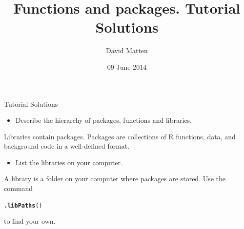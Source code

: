 \documentclass{beamer}\usepackage[]{graphicx}\usepackage[]{color}
\makeatletter
\newcommand{\hlstd}[1]{\textcolor[rgb]{0.345,0.345,0.345}{#1}}%
\newcommand{\hlkwd}[1]{\textcolor[rgb]{0.737,0.353,0.396}{\textbf{#1}}}%
\newenvironment{kframe}{%
 \def\at@end@of@kframe{}%
 \ifinner\ifhmode%
  \def\at@end@of@kframe{\end{minipage}}%
  \begin{minipage}{\columnwidth}%
 \fi\fi%
 \def\FrameCommand##1{\hskip\@totalleftmargin \hskip-\fboxsep
 \colorbox{shadecolor}{##1}\hskip-\fboxsep
     \hskip-\linewidth \hskip-\@totalleftmargin \hskip\columnwidth}%
 \MakeFramed {\advance\hsize-\width
   \@totalleftmargin\z@ \linewidth\hsize
   \@setminipage}}%
 {\par\unskip\endMakeFramed%
 \at@end@of@kframe}
\newenvironment{knitrout}{}{} %
\makeatother
\begin{document}
\title{Functions and packages. Tutorial Solutions}
\author{David Matten}
\date{09 June 2014}


\maketitle


\begin{frame}[fragile]{Tutorial Solutions}

\begin{itemize}
\item Describe the hierarchy of packages, functions and libraries.
\end{itemize}
Libraries contain packages.
Packages are collections of R functions, data, and background code in a well-defined format.

\begin{itemize}
\item List the libraries on your computer.
\end{itemize}
A library is a folder on your computer where packages are stored.
Use the command
\begin{knitrout}
\color{fgcolor}\begin{kframe}
\begin{alltt}
\hlkwd{.libPaths}\hlstd{()}
\end{alltt}
\end{kframe}
\end{knitrout}
to find your own.
\end{frame}
\end{document}
